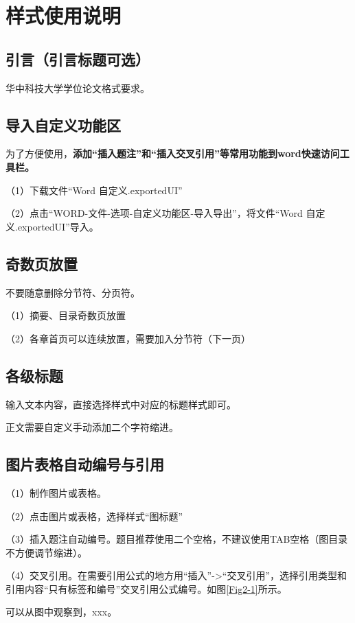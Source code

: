 

\chapter{样式使用说明}
\label{cha:command}


\section{引言（引言标题可选）}
\label{sec:cover}
华中科技大学学位论文格式要求。

\section{导入自定义功能区}
为了方便使用，\textbf{添加“插入题注”和“插入交叉引用”等常用功能到word快速访问工具栏。}

（1）下载文件“Word 自定义.exportedUI”

（2）点击“WORD-文件-选项-自定义功能区-导入导出”，将文件“Word 自定义.exportedUI”导入。


\section{奇数页放置}
不要随意删除分节符、分页符。

（1）摘要、目录奇数页放置

（2）各章首页可以连续放置，需要加入分节符（下一页）

\section{各级标题}
输入文本内容，直接选择样式中对应的标题样式即可。

正文需要自定义手动添加二个字符缩进。


\section{图片表格自动编号与引用}
（1）制作图片或表格。

（2）点击图片或表格，选择样式“图标题”

（3）插入题注自动编号。题目推荐使用二个空格，不建议使用TAB空格（图目录不方便调节缩进）。

（4）交叉引用。在需要引用公式的地方用“插入”->“交叉引用”，选择引用类型和引用内容“只有标签和编号”交叉引用公式编号。如图\ref{Fig2-1}所示。

可以从图中观察到，xxx。

